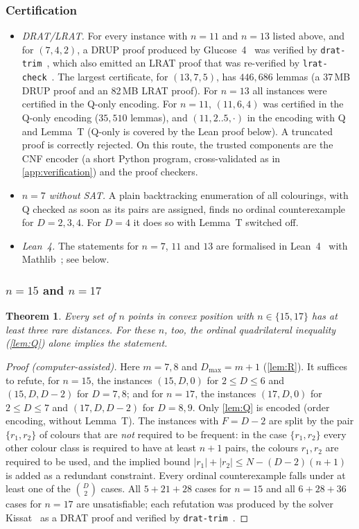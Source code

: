 \documentclass[11pt]{amsart}
\newtheorem{theorem}{Theorem}[section]
\theoremstyle{definition}
\theoremstyle{remark}
\begin{document}
\subsubsection*{Certification}
\begin{itemize}[leftmargin=2em]
\item \emph{DRAT/LRAT.} For every instance with $n=11$ and $n=13$ listed above, and for $(7,4,2)$, a DRUP proof produced by Glucose~4~\cite{glucose} was verified by \texttt{drat-trim}~\cite{drattrim}, which also emitted an LRAT proof that was re-verified by \texttt{lrat-check}~\cite{lrat}. The largest certificate, for $(13,7,5)$, has $446{,}686$ lemmas (a 37\,MB DRUP proof and an 82\,MB LRAT proof). For $n=13$ all instances were certified in the Q-only encoding. For $n=11$, $(11,6,4)$ was certified in the Q-only encoding ($35{,}510$ lemmas), and $(11,2..5,\cdot)$ in the encoding with Q and Lemma~T (Q-only is covered by the Lean proof below). A truncated proof is correctly rejected. On this route, the trusted components are the CNF encoder (a short Python program, cross-validated as in \cref{app:verification}) and the proof checkers.
\item \emph{$n=7$ without SAT.} A plain backtracking enumeration of all colourings, with Q checked as soon as its pairs are assigned, finds no ordinal counterexample for $D=2,3,4$. For $D=4$ it does so with Lemma~T switched off.
\item \emph{Lean~4.} The statements for $n=7$, $11$ and $13$ are formalised in Lean~4~\cite{lean4} with Mathlib~\cite{mathlib}; see below.
\end{itemize}

\subsubsection*{$n=15$ and $n=17$}
\begin{theorem}\label{thm:1517}
Every set of $n$ points in convex position with $n\in\{15,17\}$ has at least three rare distances. For these $n$, too, the ordinal quadrilateral inequality (\cref{lem:Q}) alone implies the statement.
\end{theorem}
\begin{proof}[Proof (computer-assisted)]
Here $m=7,8$ and $D_{\max}=m+1$ (\cref{lem:R}). It suffices to refute, for $n=15$, the instances $(15,D,0)$ for $2\le D\le6$ and $(15,D,D-2)$ for $D=7,8$; and for $n=17$, the instances $(17,D,0)$ for $2\le D\le7$ and $(17,D,D-2)$ for $D=8,9$. Only \cref{lem:Q} is encoded (order encoding, without Lemma~T). The instances with $F=D-2$ are split by the pair $\{r_1,r_2\}$ of colours that are \emph{not} required to be frequent: in the case $\{r_1,r_2\}$ every other colour class is required to have at least $n+1$ pairs, the colours $r_1,r_2$ are required to be used, and the implied bound $|r_1|+|r_2|\le N-(D-2)(n+1)$ is added as a redundant constraint. Every ordinal counterexample falls under at least one of the $\binom D2$ cases. All $5+21+28$ cases for $n=15$ and all $6+28+36$ cases for $n=17$ are unsatisfiable; each refutation was produced by the solver Kissat~\cite{kissat} as a DRAT proof and verified by \texttt{drat-trim}~\cite{drattrim}.
\end{proof}
\end{document}
